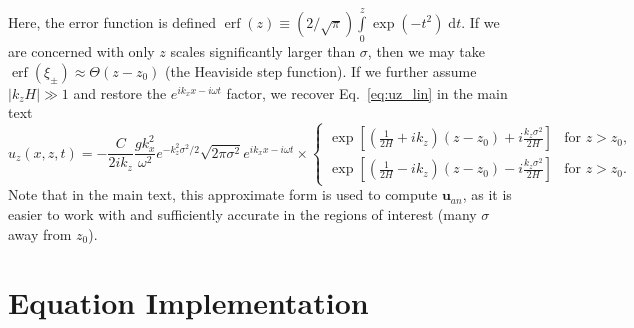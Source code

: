 \documentclass[
        fleqn,
        usenatbib,
    ]{mnras}
\newcommand*{\abs}[1]{\left|#1\right|}
\newcommand*{\p}[1]{\left(#1\right)}
\newcommand*{\s}[1]{\left[#1\right]}
\newcommand*{\bm}[1]{\mathbf{#1}}
\DeclareMathOperator*{\erf}{erf}
\begin{document}
Here, the error function is defined $\erf(z) \equiv
\p{2/\sqrt{\pi}}\int\limits_0^z \exp\p{-t^2}\;\mathrm{d}t$. If we are concerned
with only $z$ scales significantly larger than $\sigma$, then we may take
$\erf(\xi_{\pm}) \approx \Theta(z - z_0)$ (the Heaviside step function). If we
further assume $\abs{k_zH} \gg 1$ and restore the $e^{ik_xx - i\omega t}$
factor, we recover Eq.~\eqref{eq:uz_lin} in the main text
\begin{equation}
    u_{z}(x, z, t) = -\frac{C}{2ik_z}\frac{gk_x^2}{\omega^2}
        e^{-k_z^2\sigma^2 / 2}
        \sqrt{2\pi \sigma^2} e^{ik_xx - i\omega t} \times
    \begin{cases}
        \exp\s{\p{\frac{1}{2H} + ik_z}\p{z - z_0} + i\frac{k_z\sigma^2}{2H}}
            & \text{for }z > z_0,\\[5pt]
        \exp\s{\p{\frac{1}{2H} - ik_z}\p{z - z_0} - i\frac{k_z\sigma^2}{2H}}
            & \text{for }z > z_0.
    \end{cases}
\end{equation}
Note that in the main text, this approximate form is used to compute
$\bm{u}_{an}$, as it is easier to work with and sufficiently accurate in the
regions of interest (many $\sigma$ away from $z_0$).

\section{Equation Implementation}\label{se:strat_impl}
\end{document}
